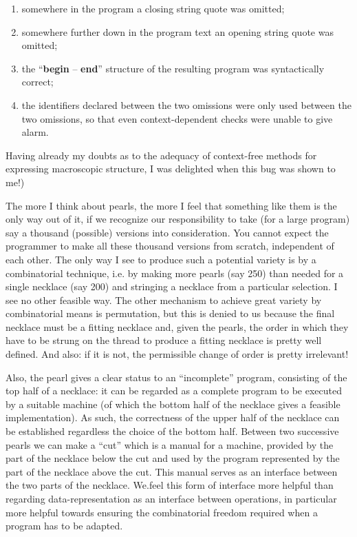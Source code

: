 \begin{enumerate}[leftmargin=2\parindent, label=(\arabic*)]
	\item somewhere in the program a closing string quote was omitted;
	
	\item somewhere further down in the program text an opening string quote was omitted;
	
	\item the ``\textbf{begin} -- \textbf{end}'' structure of the resulting program was syntactically correct;
	
	\item the identifiers declared between the two omissions were only used 	between the two omissions, so that even context-dependent checks were 	unable to give alarm.
\end{enumerate}

\noindent
Having already my doubts as to the adequacy of context-free methods for expressing macroscopic structure, I was delighted when this bug was shown to me!)

The more I think about pearls, the more I feel that something like them is the only way out of it, if we recognize our responsibility to take (for a large program) say a thousand (possible) versions into consideration. You cannot expect the programmer to make all these thousand versions from scratch, independent of each other. The only way I see to produce such a potential variety is by a combinatorial technique, i.e. by making more pearls (say 250) than needed for a single necklace (say 200) and stringing a necklace from a particular selection. I see no other feasible way. The other mechanism to achieve great variety by combinatorial means is permutation, but this is denied to us because the final necklace must be a fitting necklace and, given the pearls, the order in which they have to be strung on the thread to produce a fitting necklace is pretty well defined. And also: if it is not, the permissible change of order is pretty irrelevant!

Also, the pearl gives a clear status to an ``incomplete'' program, consisting of the top half of a necklace: it can be regarded as a complete program to be executed by a suitable machine (of which the bottom half of the necklace gives a feasible implementation). As such, the correctness of the upper half of the necklace can be established regardless the choice of the bottom half. Between two successive pearls we can make a ``cut'' which is a manual for a machine, provided by the part of the necklace below the cut and used by the program represented by the part of the necklace above the cut. This manual serves as an interface between the two parts of the necklace. We.feel this form of interface more helpful than regarding data-representation as an interface between operations, in particular more helpful towards ensuring the combinatorial freedom required when a program has to be adapted.


